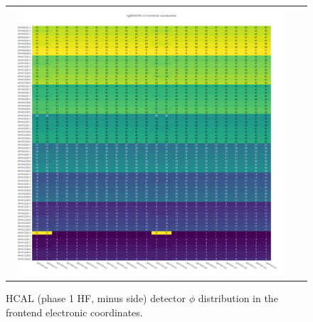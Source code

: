 \begin{figure}[htb]
 \begin{center}
  \begin{tabular}{cc}
   \includegraphics[angle=0,width=0.95\textwidth]{figures/appendix/ngHFM_Phi_in_FrontEnd.png}
  \end{tabular}
  \caption{HCAL (phase 1 HF, minus side) detector $\phi$ distribution in the frontend electronic coordinates.}
  \label{fig:lmapngHFMPhiFEC}
 \end{center}
\end{figure}
\clearpage

